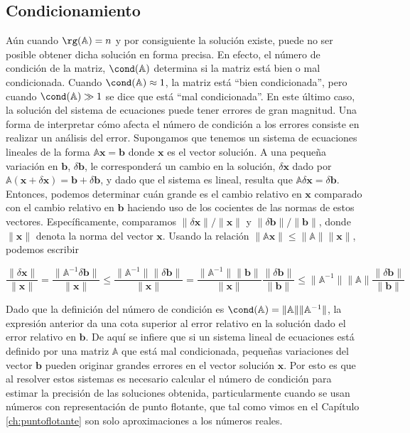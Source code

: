 \subsection{Condicionamiento}\label{sec:condic}

Aún cuando $\rg(\mathbb{A}) = n$ y por consiguiente la solución existe, puede no ser posible obtener dicha solución en forma precisa. En efecto, el número de condición de la matriz, $\cond(\mathbb{A})$ determina si la matriz está bien o mal condicionada. Cuando $\cond(\mathbb{A}) \approx 1$, la matriz está ``bien condicionada'', pero cuando $\cond(\mathbb{A}) \gg 1$ se dice que está ``mal condicionada''. En este último caso, la solución del sistema de ecuaciones puede tener errores de gran magnitud. Una forma de interpretar cómo afecta el número de condición a los errores consiste en realizar un análisis del error. Supongamos que tenemos un sistema de ecuaciones lineales de la forma $\mathbb{A} \bm{x} = \bm{b}$ donde $\bm{x}$ es el vector solución. A una pequeña variación en $\bm{b}$, $\delta \bm{b}$, le corresponderá un cambio en la solución, $\delta \bm{x}$ dado por $\mathbb{A} (\bm{x} + \delta \bm{x}) = \bm{b} + \delta \bm{b}$, y dado que el sistema es lineal, resulta que $\mathbb{A} \delta \bm{x} = \delta \bm{b}$. Entonces, podemos determinar cuán grande es el cambio relativo en $\bm{x}$ comparado con el cambio relativo en $\bm{b}$ haciendo uso de los cocientes de las normas de estos vectores. Específicamente, comparamos $\lVert \delta \bm{x} \rVert / \lVert \bm{x} \rVert$ y $\lVert \delta \bm{b} \rVert / \lVert \bm{b} \rVert$, donde $\lVert \bm{x} \rVert$ denota la norma del vector $\bm{x}$. Usando la relación $\lVert \mathbb{A} \bm{x} \rVert \leq \lVert \mathbb{A} \rVert \lVert \bm{x} \rVert$, podemos escribir

\[ \frac{\lVert \delta \bm{x} \rVert}{\lVert \bm{x} \rVert} = \frac{\lVert \mathbb{A}^{-1} \delta \bm{b} \rVert}{\lVert \bm{x} \rVert} \leq \frac{\lVert \mathbb{A}^{-1} \rVert \lVert \delta \bm{b} \rVert}{\lVert \bm{x} \rVert} = \frac{\lVert \mathbb{A}^{-1} \rVert \lVert \bm{b} \rVert}{\lVert  \bm{x} \rVert} \frac{\lVert \delta \bm{b} \rVert}{\lVert \bm{b}\rVert} \leq \lVert \mathbb{A}^{-1} \rVert \lVert \mathbb{A} \rVert \frac{\lVert \delta \bm{b} \rVert}{\lVert \bm{b}\rVert} \]

Dado que la definición del número de condición es $\cond(\mathbb{A}) = \lVert \mathbb{A} \rVert \lVert \mathbb{A}^{-1} \rVert$, la expresión anterior da una cota superior al error relativo en la solución dado el error relativo en $\bm{b}$. De aquí se infiere que si un sistema lineal de ecuaciones está definido por una matriz $\mathbb{A}$ que está mal condicionada, pequeñas variaciones del vector $\bm{b}$ pueden originar grandes errores en el vector solución $\bm{x}$. Por esto es que al resolver estos sistemas es necesario calcular el número de condición para estimar la precisión de las soluciones obtenida, particularmente cuando se usan números con representación de punto flotante, que tal como vimos en el Capítulo \ref{ch:puntoflotante} son solo aproximaciones a los números reales.

